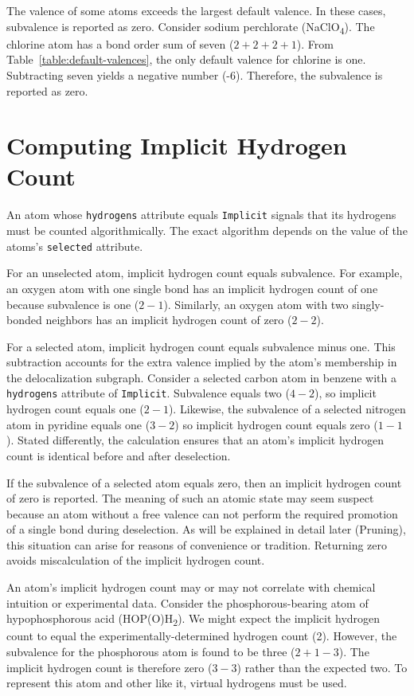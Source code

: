 \documentclass{article}
\def\ttt{\texttt}
\begin{document}
The valence of some atoms exceeds the largest default valence. In these cases, subvalence is reported as zero. Consider sodium perchlorate (NaClO\textsubscript{4}). The chlorine atom has a bond order sum of seven ($2 + 2 + 2 + 1$). From Table~\ref{table:default-valences}, the only default valence for chlorine is one. Subtracting seven yields a negative number (-6). Therefore, the subvalence is reported as zero.

\section*{Computing Implicit Hydrogen Count}
\label{computing-implicit-hydrogen-count}

An atom whose \ttt{hydrogens} attribute equals \ttt{Implicit} signals that its hydrogens must be counted algorithmically. The exact algorithm depends on the value of the atoms's \ttt{selected} attribute.

For an unselected atom, implicit hydrogen count equals subvalence. For example, an oxygen atom with one single bond has an implicit hydrogen count of one because subvalence is one ($2 - 1$). Similarly, an oxygen atom with two singly-bonded neighbors has an implicit hydrogen count of zero ($2 - 2$).

For a selected atom, implicit hydrogen count equals subvalence minus one. This subtraction accounts for the extra valence implied by the atom's membership in the delocalization subgraph. Consider a selected carbon atom in benzene with a \ttt{hydrogens} attribute of \ttt{Implicit}. Subvalence equals two ($4 - 2$), so implicit hydrogen count equals one ($2 - 1$). Likewise, the subvalence of a selected nitrogen atom in pyridine equals one ($3 - 2$) so implicit hydrogen count equals zero ($1 - 1$). Stated differently, the calculation ensures that an atom's implicit hydrogen count is identical before and after deselection.

If the subvalence of a selected atom equals zero, then an implicit hydrogen count of zero is reported. The meaning of such an atomic state may seem suspect because an atom without a free valence can not perform the required promotion of a single bond during deselection. As will be explained in detail later (Pruning), this situation can arise for reasons of convenience or tradition. Returning zero avoids miscalculation of the implicit hydrogen count.

An atom's implicit hydrogen count may or may not correlate with chemical intuition or experimental data. Consider the phosphorous-bearing atom of hypophosphorous acid (HOP(O)H\textsubscript{2}). We might expect the implicit hydrogen count to equal the experimentally-determined hydrogen count (2). However, the subvalence for the phosphorous atom is found to be three ($2 + 1 - 3$). The implicit hydrogen count is therefore zero ($3 - 3$) rather than the expected two. To represent this atom and other like it, virtual hydrogens must be used.
\end{document}

